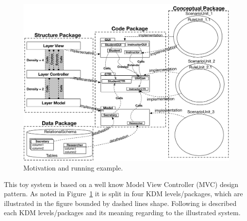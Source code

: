\begin{figure}
	\centering
	\includegraphics[scale=0.58]{figuras/NewSystemVersion}
	\caption{Motivation and running example.}
	\label{fig:system}
\end{figure}

This toy system is based on a well know Model View Controller (MVC) design pattern. As noted in Figure~\ref{fig:system} it is split in four KDM levels/packages, which are illustrated in the figure bounded by dashed lines shape. Following is described each KDM levels/packages and its meaning regarding to the illustrated system.

